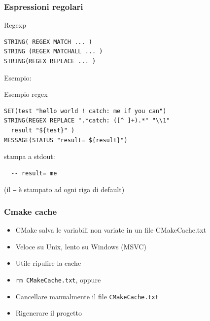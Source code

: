 \documentclass[10pt] {beamer}
\begin{document}

\begin{frame}[fragile]
\frametitle{ Espressioni regolari}

\begin{block}{Regexp}
\begin{verbatim}
STRING( REGEX MATCH ... )
STRING (REGEX MATCHALL ... )
STRING(REGEX REPLACE ... )
\end{verbatim}
\end{block}

Esempio:
\begin{block}{Esempio regex}
\begin{small}
\begin{verbatim}
SET(test "hello world ! catch: me if you can")
STRING(REGEX REPLACE ".*catch: ([^ ]+).*" "\\1" 
  result "${test}" )
MESSAGE(STATUS "result= ${result}")
\end{verbatim}
\end{small}
\end{block}
stampa a stdout:
\begin{verbatim}
  -- result= me
\end{verbatim}
(il \texttt{--} è stampato ad ogni riga di default)
\end{frame}



\begin{frame}
\frametitle{Cmake cache}
\begin{itemize}
\item CMake salva le variabili non variate in un file CMakeCache.txt
\item Veloce su Unix, lento su Windows (MSVC)
\item Utile ripulire la cache
\end{itemize}

\begin{itemize}
\item \texttt{rm CMakeCache.txt}, oppure
\item Cancellare manualmente il file \texttt{CMakeCache.txt}
\item Rigenerare il progetto
\end{itemize}

\end{frame}

\end{document}
